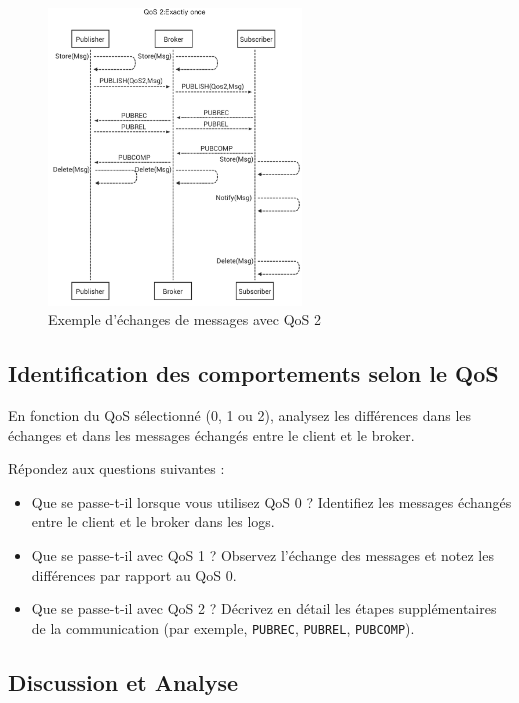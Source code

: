 \documentclass{article}
\begin{document}
\begin{figure}[H]
    \centering
    \includegraphics[width=0.6\textwidth]{Images/QoS2.png}
    \caption{Exemple d'échanges de messages avec QoS 2}
\end{figure}

\subsection{Identification des comportements selon le QoS}

En fonction du QoS sélectionné (0, 1 ou 2), analysez les différences dans les échanges et dans les messages échangés entre le client et le broker.

Répondez aux questions suivantes :

\begin{itemize}
    \item Que se passe-t-il lorsque vous utilisez QoS 0 ? Identifiez les messages échangés entre le client et le broker dans les logs.
    \item Que se passe-t-il avec QoS 1 ? Observez l'échange des messages et notez les différences par rapport au QoS 0.
    \item Que se passe-t-il avec QoS 2 ? Décrivez en détail les étapes supplémentaires de la communication (par exemple, \texttt{PUBREC}, \texttt{PUBREL}, \texttt{PUBCOMP}).
\end{itemize}

\subsection{Discussion et Analyse}
\end{document}
